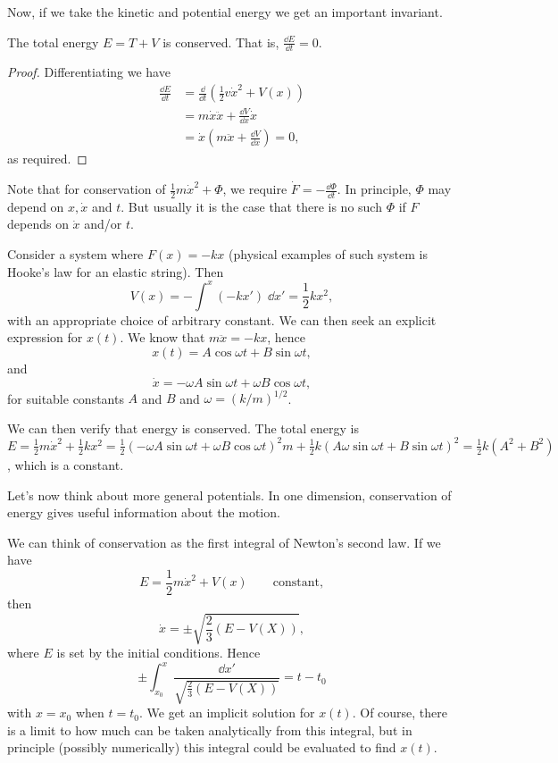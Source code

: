 \documentclass[a4paper]{scrartcl}
\begin{document}
Now, if we take the kinetic and potential energy we get an important invariant.

\begin{proposition}
	The total energy $E = T + V$ is conserved. That is, $\frac{\dd E}{\dd t} = 0$.
\end{proposition}
\begin{proof}
	Differentiating we have
	\begin{align*}
		\frac{\dd E}{\dd t} &= \frac{\dd}{\dd t} \left(\frac{1}{2} v \dot{x}^2 + V(x)\right) \\
		&= m \dot{x}\ddot{x} + \frac{\dd V}{\dd x} \dot{x} \\
		&= \dot{x} \left(m \ddot{x} + \frac{\dd V}{\dd x} \right) = 0,
	\end{align*}
	as required.
\end{proof}

Note that for conservation of $\frac{1}{2} m \dot{x}^2 + \Phi$, we require $\dot F = -\frac{\dd \Phi}{\dd t}$. In principle, $\Phi$ may depend on $x, \dot{x}$ and $t$. But usually it is the case that there is no such $\Phi$ if $F$ depends on $\dot{x}$ and/or $t$.

\begin{example}
	Consider a system where $F(x) = -k x$ (physical examples of such system is Hooke's law for an elastic string). Then
	$$
	V(x) = -\int^x (-kx') \; \dd x' = \frac{1}{2}k x^2,
	$$
	with an appropriate choice of arbitrary constant.
	We can then seek an explicit expression for $x(t).$ We know that $m \ddot{x} = -kx$, hence
	$$
x(t) = A \cos \omega t + B \sin \omega t,
	$$
	and
	$$
\dot{x} = - \omega A \sin \omega t + \omega B \cos \omega t,
$$
for suitable constants $A$ and $B$ and $\omega = (k/m)^{1/2}$.

We can then verify that energy is conserved. The total energy is $E = \frac{1}{2}m \dot{x}^2 + \frac{1}{2}kx^2 = \frac{1}{2}(-\omega A \sin \omega t + \omega B \cos \omega t)^2 m + \frac{1}{2}k (A \omega \sin \omega t + B 
\sin \omega t)^2 = \frac{1}{2}k(A^2 + B^2)$, which is a constant. 
\end{example}

Let's now think about more general potentials. In one dimension, conservation of energy gives useful information about the motion. 

We can think of conservation as the first integral of Newton's second law. If we have
$$
E = \frac{1}{2} m \dot{x}^2 + V(x) \quad \quad \text{constant},
$$
then
$$
\dot{x} = \pm\sqrt{\frac{2}{3}(E - V(X))},
$$
where $E$ is set by the initial conditions.
Hence
$$
\pm \int_{x_0}^{x} \frac{\dd x'}{\sqrt{\frac{2}{3}(E - V(X))}} = t - t_0
$$
with $x = x_0$ when $t = t_0$. We get an implicit solution for $x(t)$. Of course, there is a limit to how much can be taken analytically from this integral, but  
in principle (possibly numerically) this integral could be evaluated to find $x(t)$.
\end{document}
